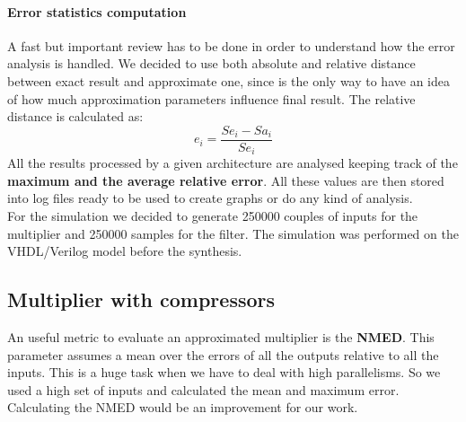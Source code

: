\documentclass[a4paper]{article}
\begin{document}
	\paragraph{Error statistics computation} A fast but important review has to be done in order to understand how the error analysis is handled.
	We decided to use both absolute and relative distance between exact result and approximate one, since is the only way to have an idea of how much approximation parameters influence final result. The relative distance is calculated as:
	\begin{equation}
		e_{i}=\frac{Se_{i}-Sa_{i}}{Se_{i}}
	\end{equation}
	All the results processed by a given architecture are analysed keeping track of the \textbf{maximum and the average relative error}. All these values are then stored into log files ready to be used to create graphs or do any kind of analysis.\\
	For the simulation we decided to generate 250000 couples of inputs for the multiplier and 250000 samples for the filter. The simulation was performed on the VHDL/Verilog model before the synthesis.

	\subsection{Multiplier with compressors}

	An useful metric to evaluate an approximated multiplier is the \textbf{NMED}. This parameter assumes a mean over the errors of all the outputs relative to all the inputs. This is a huge task when we have to deal with high parallelisms. So we used a high set of inputs and calculated the mean and maximum error. Calculating the NMED would be an improvement for our work.
\end{document}
